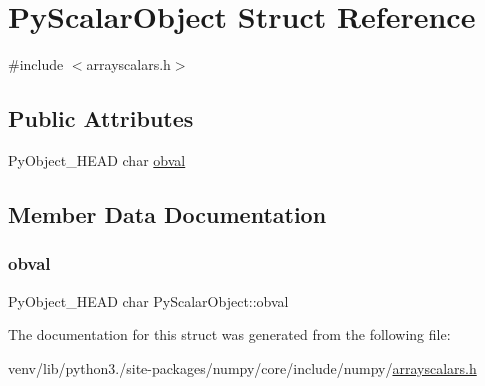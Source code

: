 \hypertarget{structPyScalarObject}{}\section{Py\+Scalar\+Object Struct Reference}
\label{structPyScalarObject}


{\ttfamily \#include $<$arrayscalars.\+h$>$}

\subsection*{Public Attributes}
\begin{DoxyCompactItemize}
\item 
Py\+Object\+\_\+\+H\+E\+AD char \hyperlink{structPyScalarObject_abbf52293ec85e1cffa4b340860410461}{obval}
\end{DoxyCompactItemize}


\subsection{Member Data Documentation}
\mbox{\label{structPyScalarObject_abbf52293ec85e1cffa4b340860410461}} 
\subsubsection{\texorpdfstring{obval}{obval}}
{\footnotesize\ttfamily Py\+Object\+\_\+\+H\+E\+AD char Py\+Scalar\+Object\+::obval}



The documentation for this struct was generated from the following file\+:\begin{DoxyCompactItemize}
\item 
venv/lib/python3./site-\/packages/numpy/core/include/numpy/\hyperlink{arrayscalars_8h}{arrayscalars.\+h}\end{DoxyCompactItemize}
